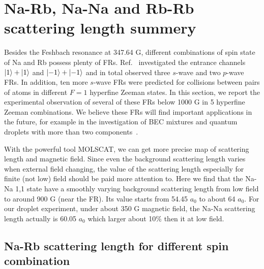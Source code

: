 \section{Na-Rb, Na-Na and Rb-Rb scattering length summery}
\label{sec:FR_spec_more}
Besides the Feshbach resonance at 347.64 G, different combinations of spin state of Na and Rb possess plenty of FRs. Ref.~\cite{Wang2013} investigated the entrance channels $\ket{1}+\ket{1}$ and $\ket{-1}+\ket{-1}$ and in total observed three $s$-wave and two $p$-wave FRs. In addition, ten more $s$-wave FRs were predicted for collisions between pairs of atoms in different $F = 1$ hyperfine Zeeman states. In this section, we report the experimental observation of several of these FRs below 1000 G in 5 hyperfine Zeeman combinations. We believe these FRs will find important applications in the future, for example in the investigation of BEC mixtures and quantum droplets with more than two components~\cite{ma2021}. 

With the powerful tool MOLSCAT, we can get more precise map of scattering length and magnetic field. Since even the background scattering length varies when external field changing, the value of the scattering length especially for finite (not low) field should be paid more attention to. Here we find that the Na-Na 1,1 state have a smoothly varying background scattering length from low field to around 900 G (near the FR). Its value starts from 54.45 $a_0$ to about 64 $a_0$. For our droplet experiment, under about 350 G magnetic field, the Na-Na scattering length actually is 60.05 $a_0$ which larger about 10\% then it at low field.

\subsection{Na-Rb scattering length for different spin combination}

